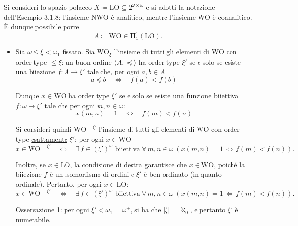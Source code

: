 \documentclass{article}
\newcommand{\card}[1]{\left\vert #1 \right\vert}
\newcommand{\1}{\mathds{1}}
\begin{document}
Si consideri lo spazio polacco \(X\coloneqq\mathrm{LO} \subseteq 2^{\omega\times\omega}\) e si adotti la notazione dell'Esempio 3.1.8: l'insieme \(\mathrm{NWO}\) è analitico, mentre l'insieme \(\mathrm{WO}\) è coanalitico. È dunque possibile porre
\begin{equation*}
A\coloneqq \mathrm{WO} \in \bm{\Pi}_{1}^{1}(\mathrm{LO}).
\end{equation*}


\begin{itemize}
\item Sia \(\omega\le\xi< \omega_{1}\) fissato. Sia \(\mathrm{WO}_{\xi}\) l'insieme di tutti gli elementi di \(\mathrm{WO}\) con order type \(\le \xi\): un buon ordine \(\langle A, \preceq\rangle\) ha order type \(\xi'\) se e solo se esiste una biiezione \(f:A\to \xi'\) tale che, per ogni \(a,b \in A\)
\begin{equation*}
  	a\preceq b\quad \iff\quad f(a)< f(b)
\end{equation*}

Dunque \(x \in \mathrm{WO}\) ha order type \(\xi'\) se e solo se esiste una funzione biiettiva \(f:\omega \to\xi'\) tale che per ogni \(m,n \in \omega\):
\begin{equation*}
  	x(m,n) = 1\quad\iff\quad f(m)< f(n)
\end{equation*}

Si consideri quindi \(\mathrm{WO}^{=\xi'}\) l'insieme di tutti gli elementi di \(\mathrm{WO}\) con order type \uline{esattamente} \(\xi'\): per ogni \(x \in \mathrm{WO}\):
\begin{equation*}
  	x \in \mathrm{WO}^{=\xi'} \quad \iff \quad\exists\, f \in (\xi')^{\omega}\text{ biiettiva}\ \forall\, m,n \in\omega\ \left(x(m,n)=1\,\iff\, f(m)<f(n)\right).
\end{equation*}

Inoltre, se \(x \in \mathrm{LO}\), la condizione di destra garantisce che \(x \in \mathrm{WO}\), poiché la biiezione \(f\) è un isomorfismo di ordini e \(\xi'\) è ben ordinato (in quanto ordinale). Pertanto, per ogni \(x \in \mathrm{LO}\):
\begin{equation*}
  	x \in \mathrm{WO}^{=\xi'} \quad \iff \quad\exists\, f \in (\xi')^{\omega}\text{ biiettiva}\ \forall\, m,n \in\omega\ \left(x(m,n)=1\,\iff\, f(m)<f(n)\right).
\end{equation*}

\uline{Osservazione 1}: per ogni \(\xi' < \omega_{1}=\omega^{+}\), si ha che \(\card{\xi} =\aleph_{0}\), e pertanto \(\xi'\) è numerabile.


\end{itemize}
\end{document}
